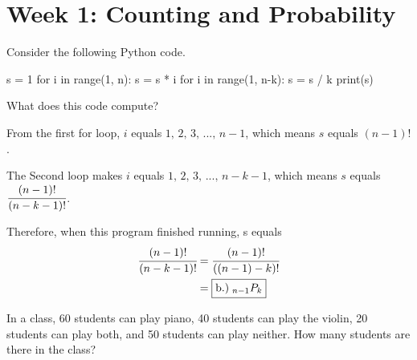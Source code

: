 \documentclass[a4paper, 10pt]{article}
\begin{document}
\subject[2110205 - Statistics for Computer Engineering]


\section{Week 1: Counting and Probability}



\begin{problem}
Consider the following Python code.
\begin{codingbox}
s = 1
for i in range(1, n):
    s = s * i
for i in range(1, n-k):
    s = s / k
print(s)
\end{codingbox}
What does this code compute?
\end{problem}

\begin{solution}
From the first for loop, \( i \) equals \( 1,\, 2,\, 3,\, ...,\, n-1 \),
which means \( s \) equals \( (n-1)! \). \par

The Second loop makes \( i \) equals \( 1,\, 2,\, 3,\, ...,\, n-k-1 \),
which means \( s \) equals \( \cfrac{(n-1)!}{(n-k-1)!} \). \par

Therefore, when this program finished running, s equals
\begin{align*}
    \cfrac{(n-1)!}{(n-k-1)!} &= \cfrac{(n-1)!}{\left((n-1) - k\right)!} \\
    &= \boxed{\text{b.)}\;_{n-1}P_k}
\end{align*}
\end{solution}


\begin{problem}
In a class, 60 students can play piano, 40 students can play the violin,
20 students can play both, and 50 students can play neither.
How many students are there in the class?
\end{problem}
\end{document}
